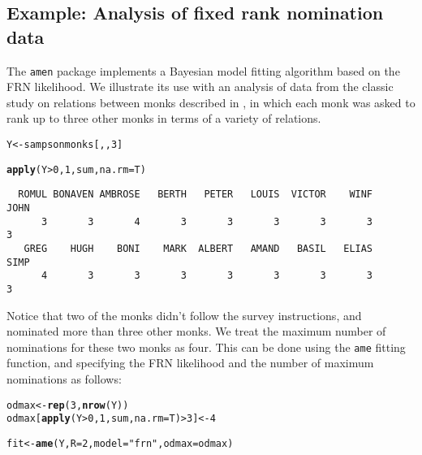 \documentclass[11pt]{article}\usepackage[]{graphicx}\usepackage[]{color}
\makeatletter
\newcommand{\hlnum}[1]{\textcolor[rgb]{0.686,0.059,0.569}{#1}}%
\newcommand{\hlstr}[1]{\textcolor[rgb]{0.192,0.494,0.8}{#1}}%
\newcommand{\hlopt}[1]{\textcolor[rgb]{0,0,0}{#1}}%
\newcommand{\hlstd}[1]{\textcolor[rgb]{0.345,0.345,0.345}{#1}}%
\newcommand{\hlkwb}[1]{\textcolor[rgb]{0.69,0.353,0.396}{#1}}%
\newcommand{\hlkwc}[1]{\textcolor[rgb]{0.333,0.667,0.333}{#1}}%
\newcommand{\hlkwd}[1]{\textcolor[rgb]{0.737,0.353,0.396}{\textbf{#1}}}%
\newenvironment{kframe}{%
 \def\at@end@of@kframe{}%
 \ifinner\ifhmode%
  \def\at@end@of@kframe{\end{minipage}}%
  \begin{minipage}{\columnwidth}%
 \fi\fi%
 \def\FrameCommand##1{\hskip\@totalleftmargin \hskip-\fboxsep
 \colorbox{shadecolor}{##1}\hskip-\fboxsep
     \hskip-\linewidth \hskip-\@totalleftmargin \hskip\columnwidth}%
 \MakeFramed {\advance\hsize-\width
   \@totalleftmargin\z@ \linewidth\hsize
   \@setminipage}}%
 {\par\unskip\endMakeFramed%
 \at@end@of@kframe}
\newenvironment{knitrout}{}{} %
\makeatother
\begin{document}
\subsection{Example: Analysis of fixed rank nomination data}
The {\tt amen} package implements a Bayesian model fitting 
algorithm based on the FRN likelihood. 
We illustrate its use with an analysis of  data from the classic 
study on relations between monks 
described in \citet{sampson_1969}, in which each monk was asked to rank 
up to three other monks in terms of a variety of relations. 
\begin{knitrout}\footnotesize
{}\color{fgcolor}\begin{kframe}
\begin{alltt}
\hlstd{Y}\hlkwb{<-}\hlstd{sampsonmonks[,,}\hlnum{3}\hlstd{]}

\hlkwd{apply}\hlstd{(Y}\hlopt{>}\hlnum{0}\hlstd{,}\hlnum{1}\hlstd{,sum,}\hlkwc{na.rm}\hlstd{=T)}
\end{alltt}
\begin{verbatim}
  ROMUL BONAVEN AMBROSE   BERTH   PETER   LOUIS  VICTOR    WINF    JOHN 
      3       3       4       3       3       3       3       3       3 
   GREG    HUGH    BONI    MARK  ALBERT   AMAND   BASIL   ELIAS    SIMP 
      4       3       3       3       3       3       3       3       3 
\end{verbatim}
\end{kframe}
\end{knitrout}
Notice that two of the monks didn't follow the survey instructions, and 
nominated more than three other monks. We treat the maximum 
number of nominations for these two monks as four. 
This can be done using the {\tt ame} fitting function, and 
specifying the FRN likelihood and the number of maximum nominations as follows:
\begin{knitrout}\footnotesize
{}\color{fgcolor}\begin{kframe}
\begin{alltt}
\hlstd{odmax}\hlkwb{<-}\hlkwd{rep}\hlstd{(}\hlnum{3}\hlstd{,}\hlkwd{nrow}\hlstd{(Y))}
\hlstd{odmax[} \hlkwd{apply}\hlstd{(Y}\hlopt{>}\hlnum{0}\hlstd{,}\hlnum{1}\hlstd{,sum,}\hlkwc{na.rm}\hlstd{=T)}\hlopt{>}\hlnum{3} \hlstd{]}\hlkwb{<-}\hlnum{4}

\hlstd{fit}\hlkwb{<-}\hlkwd{ame}\hlstd{(Y,}\hlkwc{R}\hlstd{=}\hlnum{2}\hlstd{,}\hlkwc{model}\hlstd{=}\hlstr{"frn"}\hlstd{,}\hlkwc{odmax}\hlstd{=odmax)}
\end{alltt}
\end{kframe}
\end{knitrout}
\end{document}
